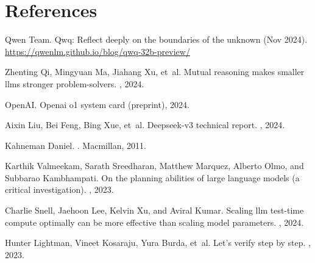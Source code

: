 \section{References}

\begin{thebibliography}{10}

Qwen Team.
\newblock Qwq: Reflect deeply on the boundaries of the unknown (Nov 2024).
\newblock \url{https://qwenlm.github.io/blog/qwq-32b-preview/}

Zhenting Qi, Mingyuan Ma, Jiahang Xu, et~al.
\newblock Mutual reasoning makes smaller llms stronger problem-solvers.
, 2024.

OpenAI.
\newblock Openai o1 system card (preprint), 2024.

Aixin Liu, Bei Feng, Bing Xue, et~al.
\newblock Deepseek-v3 technical report.
, 2024.

Kahneman Daniel.
.
\newblock Macmillan, 2011.

Karthik Valmeekam, Sarath Sreedharan, Matthew Marquez, Alberto Olmo, and
  Subbarao Kambhampati.
\newblock On the planning abilities of large language models (a critical
  investigation).
, 2023.

Charlie Snell, Jaehoon Lee, Kelvin Xu, and Aviral Kumar.
\newblock Scaling llm test-time compute optimally can be more effective than
  scaling model parameters.
, 2024.

Hunter Lightman, Vineet Kosaraju, Yura Burda, et~al.
\newblock Let's verify step by step.
, 2023.

\end{thebibliography}

